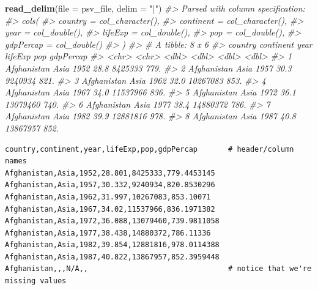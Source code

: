 \documentclass[
]{report}
\newenvironment{Shaded}{\begin{snugshade}}{\end{snugshade}}
\newcommand{\CommentTok}[1]{\textcolor[rgb]{0.56,0.35,0.01}{\textit{#1}}}
\newcommand{\DataTypeTok}[1]{\textcolor[rgb]{0.13,0.29,0.53}{#1}}
\newcommand{\KeywordTok}[1]{\textcolor[rgb]{0.13,0.29,0.53}{\textbf{#1}}}
\newcommand{\NormalTok}[1]{#1}
\newcommand{\StringTok}[1]{\textcolor[rgb]{0.31,0.60,0.02}{#1}}
\begin{document}
\begin{Shaded}
\begin{Highlighting}[]
\KeywordTok{read\_delim}\NormalTok{(}\DataTypeTok{file =}\NormalTok{ psv\_file, }\DataTypeTok{delim =} \StringTok{"|"}\NormalTok{)}
\CommentTok{\#\textgreater{} Parsed with column specification:}
\CommentTok{\#\textgreater{} cols(}
\CommentTok{\#\textgreater{}   country = col\_character(),}
\CommentTok{\#\textgreater{}   continent = col\_character(),}
\CommentTok{\#\textgreater{}   year = col\_double(),}
\CommentTok{\#\textgreater{}   lifeExp = col\_double(),}
\CommentTok{\#\textgreater{}   pop = col\_double(),}
\CommentTok{\#\textgreater{}   \textasciigrave{}gdpPercap     \textasciigrave{} = col\_double()}
\CommentTok{\#\textgreater{} )}
\CommentTok{\#\textgreater{} \# A tibble: 8 x 6}
\CommentTok{\#\textgreater{}   country     continent  year lifeExp      pop \textasciigrave{}gdpPercap     \textasciigrave{}}
\CommentTok{\#\textgreater{}   \textless{}chr\textgreater{}       \textless{}chr\textgreater{}     \textless{}dbl\textgreater{}   \textless{}dbl\textgreater{}    \textless{}dbl\textgreater{}            \textless{}dbl\textgreater{}}
\CommentTok{\#\textgreater{} 1 Afghanistan Asia       1952    28.8  8425333             779.}
\CommentTok{\#\textgreater{} 2 Afghanistan Asia       1957    30.3  9240934             821.}
\CommentTok{\#\textgreater{} 3 Afghanistan Asia       1962    32.0 10267083             853.}
\CommentTok{\#\textgreater{} 4 Afghanistan Asia       1967    34.0 11537966             836.}
\CommentTok{\#\textgreater{} 5 Afghanistan Asia       1972    36.1 13079460             740.}
\CommentTok{\#\textgreater{} 6 Afghanistan Asia       1977    38.4 14880372             786.}
\CommentTok{\#\textgreater{} 7 Afghanistan Asia       1982    39.9 12881816             978.}
\CommentTok{\#\textgreater{} 8 Afghanistan Asia       1987    40.8 13867957             852.}
\end{Highlighting}
\end{Shaded}

\begin{verbatim}
country,continent,year,lifeExp,pop,gdpPercap       # header/column names
Afghanistan,Asia,1952,28.801,8425333,779.4453145
Afghanistan,Asia,1957,30.332,9240934,820.8530296
Afghanistan,Asia,1962,31.997,10267083,853.10071
Afghanistan,Asia,1967,34.02,11537966,836.1971382
Afghanistan,Asia,1972,36.088,13079460,739.9811058
Afghanistan,Asia,1977,38.438,14880372,786.11336
Afghanistan,Asia,1982,39.854,12881816,978.0114388
Afghanistan,Asia,1987,40.822,13867957,852.3959448
Afghanistan,,,N/A,,                                # notice that we're missing values
\end{verbatim}
\end{document}
